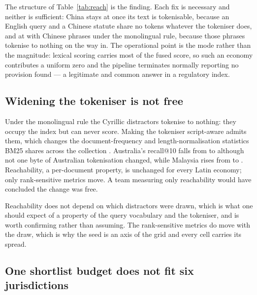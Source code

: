 \documentclass{article}
\begin{document}

The structure of Table~\ref{tab:reach} is the finding. Each fix is necessary and
neither is sufficient: China stays at  once its text is
tokenisable, because an English query and a Chinese statute share no tokens
whatever the tokeniser does, and at  with Chinese
phrases under the monolingual rule, because those phrases tokenise to nothing on
the way in. The operational point is the mode rather than the magnitude: lexical
scoring carries most of the fused score, so such an economy contributes a uniform
zero and the pipeline terminates normally reporting no provision found --- a
legitimate and common answer in a regulatory index.

\subsection{Widening the tokeniser is not free}


Under the monolingual rule the Cyrillic distractors tokenise to nothing: they
occupy the index but can never score. Making the tokeniser script-aware admits
them, which changes the document-frequency and length-normalisation statistics
BM25 shares across the collection \citep{robertson2009bm25}. Australia's
recall@10 falls from  to  although not one
byte of Australian tokenisation changed, while Malaysia rises from
 to . Reachability, a per-document
property, is unchanged for every Latin economy; only rank-sensitive metrics move.
A team measuring only reachability would have concluded the change was free.


Reachability does not depend on which distractors were drawn, which is what one
should expect of a property of the query vocabulary and the tokeniser, and is
worth confirming rather than assuming. The rank-sensitive metrics do move with
the draw, which is why the seed is an axis of the grid and every cell carries its
spread.

\subsection{One shortlist budget does not fit six jurisdictions}
\label{sec:budget}
\end{document}
